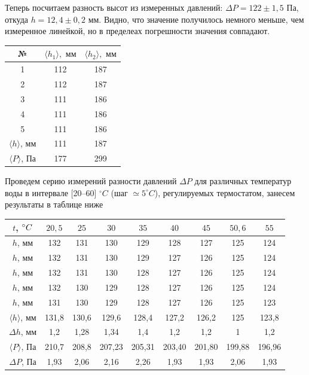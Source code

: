\documentclass[a4paper, 12pt]{article} %
\begin{document}
Теперь посчитаем разность высот из измеренных давлений: $\Delta P = 122 \pm 1,5$ Па, откуда $h = 12,4 \pm 0,2$ мм. Видно, что значение получилось немного меньше, чем измеренное линейкой, но в пределеах погрешности значения совпадают.

\begin{center}
	\begin{tabular}{|c|c|c|}
	\hline 
	№ & $ \langle h_1 \rangle, \text{ мм}$ & $\langle h_2 \rangle, \text{ мм}$ \\ 
	\hline 
	1 & 112 & 187 \\ 
	\hline 
	2 & 112 & 187 \\ 
	\hline 
	3 & 111 & 186 \\ 
	\hline 
	4 & 111 & 186 \\ 
	\hline 
	5 & 111 & 186 \\ 
	\hline
	$ \langle h \rangle$, мм & 111 & 187 \\ 
	\hline
	$ \langle P \rangle$, Па & 177 & 299 \\ 
	\hline 
	\end{tabular} 
\end{center}

\bigskip

Проведем серию измерений разности давлений $\Delta P$ для различных температур воды в интервале [20--60] $^\circ C$ (шаг $\simeq 5^\circ C$), регулируемых термостатом, занесем результаты в таблице ниже

\begin{center}
\begin{tabular}{|c|c|c|c|c|c|c|c|c|}
\hline
	$t$, $\degree C$ & $20,5$ & $25$ & $30$ & $35$ & $40$ & $45$ & $50,6$ & $55$ 	\\
	\hline
	$h$, мм & 132 & 131 & 130 & 129 & 128 & 127 & 125 & 124\\
	\hline
	$h$, мм & 132 & 131 & 130 & 129 & 127 & 126 & 125 & 124\\
	\hline
	$h$, мм & 132 & 131 & 130 & 128 & 127 & 126 & 125 & 124\\
	\hline
	$h$, мм & 132 & 130 & 129 & 128 & 127 & 126 & 125 & 124\\
	\hline
	$h$, мм & 131 & 130 & 129 & 128 & 127 & 126 & 125 & 123\\
	\hline
	$ \langle h \rangle$, мм & 131,8 & 130,6 & 129,6 & 128,4 & 127,2 & 126,2 & 125 & 123,8\\
	\hline
	$\Delta h $, мм & 1,2 & 1,28 & 1,34 & 1,4 & 1,2 & 1,2 & 1 & 1,2\\
	\hline
	$\langle P \rangle$, Па & 210,7 & 208,8 & 207,23 & 205,31 & 203,40 & 201,80 & 199,88 & 196,96 \\
	\hline
	$\Delta P$, Па & 1,93 & 2,06 & 2,16 & 2,26 & 1,93 & 1,93 & 2,06 & 1,93 \\
	\hline
\end{tabular}
\end{center}
\end{document}
